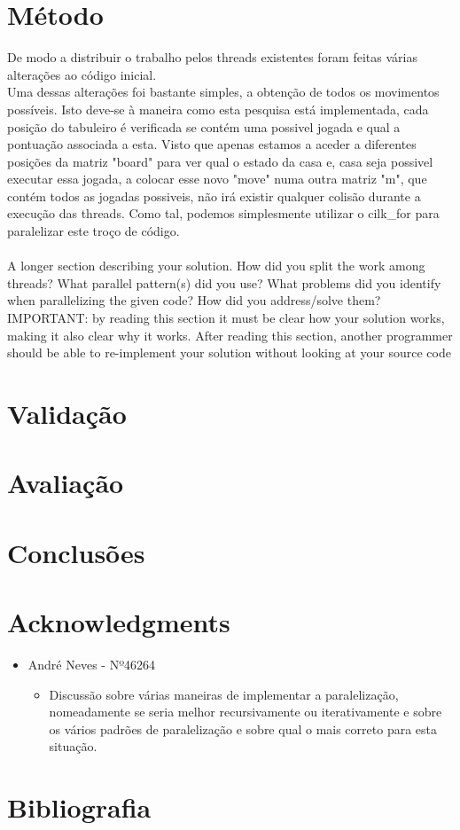 \documentclass[a4paper]{article}
\begin{document}
\section{Método}
De modo a distribuir o trabalho pelos threads existentes foram feitas várias alterações ao código inicial.\\ 
Uma dessas alterações foi bastante simples, a obtenção de todos os movimentos possíveis. Isto deve-se à maneira como esta pesquisa está implementada, cada posição do tabuleiro é verificada se contém uma possivel jogada e qual a pontuação associada a esta. 
Visto que apenas estamos a aceder a diferentes posições da matriz "board" para ver qual o estado da casa e, casa seja possivel executar essa jogada, a colocar esse novo "move" numa outra matriz "m", que contém todos as jogadas possiveis, não irá existir qualquer colisão durante a execução das threads. Como tal, podemos simplesmente utilizar o cilk\_for para paralelizar este troço de código. 
\\\\ A	longer	section	describing	your	solution.	How	did	you	split	the	work	
among	 threads?	What	parallel	pattern(s)	did	you	use?	 What	problems	did	you	
identify	 when	 parallelizing	 the	 given	 code?	 	 How	 did	 you	 address/solve	 them?	
IMPORTANT:	 by reading	 this	 section	 it	must	 be	 clear	 how	 your	 solution	works,	
making	it	also	clear	why	it	works.	After	reading	this	section,	another	programmer	
should	be	able	to	re-implement	your	solution	without	looking	at	your	source	code

\section{Validação}

\section{Avaliação}

\section{Conclusões}

\section{Acknowledgments}
\begin{itemize}
\item André Neves - Nº46264
\begin{itemize}
\item Discussão sobre várias maneiras de implementar a paralelização, nomeadamente se seria melhor recursivamente ou iterativamente e sobre os vários padrões de paralelização e sobre qual o mais correto para esta situação.
\end{itemize}

\end{itemize}

\section{Bibliografia}
\end{document}
